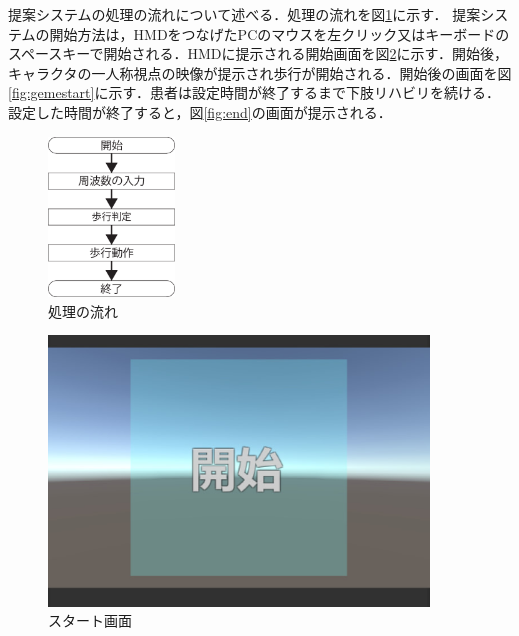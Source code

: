 提案システムの処理の流れについて述べる．処理の流れを図\ref{fig:片桐2}に示す．
提案システムの開始方法は，HMDをつなげたPCのマウスを左クリック又はキーボードのスペースキーで開始される．HMDに提示される開始画面を図\ref{fig:start}に示す．開始後，キャラクタの一人称視点の映像が提示され歩行が開始される．開始後の画面を図\ref{fig:gemestart}に示す．患者は設定時間が終了するまで下肢リハビリを続ける．設定した時間が終了すると，図\ref{fig:end}の画面が提示される．
\begin{figure}[tbp]
	\centering
			\includegraphics[width=0.3\textwidth]{chap2-figure/katagiri2.eps}
	\caption{処理の流れ}
	\label{fig:片桐2}
\end{figure}

\begin{figure}[tbp]
	\centering
			\includegraphics[width=0.9\textwidth]{chap2-figure/start.eps}
	\caption{スタート画面}
	\label{fig:start}
\end{figure}

